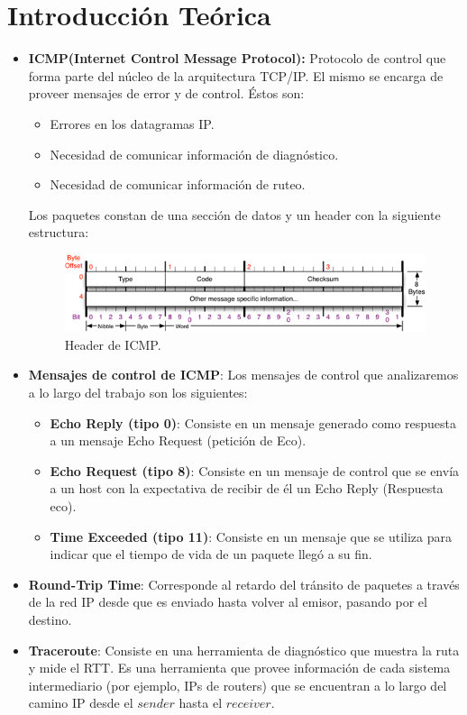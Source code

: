 \documentclass[10pt, a4paper]{article}
\begin{document}
\section{Introducción Teórica}
\begin{itemize}
\item \textbf{ICMP(Internet Control Message Protocol):} Protocolo de control que forma parte del núcleo de la arquitectura TCP/IP. El mismo se encarga de proveer mensajes de error y de control. Éstos son:
\begin{itemize}
\item Errores en los datagramas IP.
\item Necesidad de comunicar información de diagnóstico.
\item Necesidad de comunicar información de ruteo.
\end{itemize}
Los paquetes constan de una sección de datos y un header con la siguiente estructura:

\begin{figure}[H] %
\begin{center}
\includegraphics[width=410pt]{../imgs/icmp.png}
\caption{Header de ICMP.}
\end{center}
\end{figure}

\item \textbf{Mensajes de control de ICMP}:
Los mensajes de control que analizaremos a lo largo del trabajo son los siguientes:
\begin{itemize}
\item \textbf{Echo Reply (tipo 0)}: Consiste en un mensaje generado como respuesta a un mensaje Echo Request (petición de Eco).
\item \textbf{Echo Request (tipo 8)}: Consiste en un mensaje de control que se envía a un host con la expectativa de recibir de él un Echo Reply (Respuesta eco).
\item \textbf{Time Exceeded (tipo 11)}: Consiste en un mensaje que se utiliza para indicar que el tiempo de vida de un paquete llegó a su fin.
\end{itemize}

\item \textbf{Round-Trip Time}: Corresponde al retardo del tránsito de paquetes a través de la red IP desde que es enviado hasta volver al emisor, pasando por el destino.

\item \textbf{Traceroute}: Consiste en una herramienta de diagnóstico que muestra la ruta y mide el RTT. Es una herramienta que provee información de cada sistema intermediario (por ejemplo, IPs de routers) que se encuentran a lo largo del camino IP desde el $sender$ hasta el $receiver$. 

\end{itemize}
\end{document}
